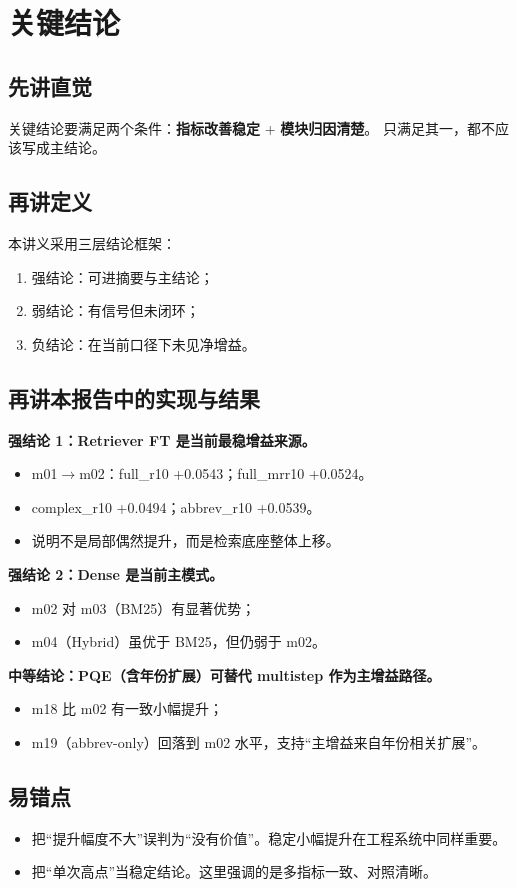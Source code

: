 \documentclass[UTF8,a4paper,12pt]{ctexart}
\begin{document}
\section{关键结论}
\subsection{先讲直觉}
关键结论要满足两个条件：\textbf{指标改善稳定} + \textbf{模块归因清楚}。
只满足其一，都不应该写成主结论。

\subsection{再讲定义}
本讲义采用三层结论框架：
\begin{enumerate}
  \item 强结论：可进摘要与主结论；
  \item 弱结论：有信号但未闭环；
  \item 负结论：在当前口径下未见净增益。
\end{enumerate}

\subsection{再讲本报告中的实现与结果}
\textbf{强结论 1：Retriever FT 是当前最稳增益来源。}
\begin{itemize}
  \item m01$\rightarrow$m02：full\_r10 +0.0543；full\_mrr10 +0.0524。
  \item complex\_r10 +0.0494；abbrev\_r10 +0.0539。
  \item 说明不是局部偶然提升，而是检索底座整体上移。
\end{itemize}

\textbf{强结论 2：Dense 是当前主模式。}
\begin{itemize}
  \item m02 对 m03（BM25）有显著优势；
  \item m04（Hybrid）虽优于 BM25，但仍弱于 m02。
\end{itemize}

\textbf{中等结论：PQE（含年份扩展）可替代 multistep 作为主增益路径。}
\begin{itemize}
  \item m18 比 m02 有一致小幅提升；
  \item m19（abbrev-only）回落到 m02 水平，支持“主增益来自年份相关扩展”。
\end{itemize}

\subsection{易错点}
\begin{itemize}
  \item 把“提升幅度不大”误判为“没有价值”。稳定小幅提升在工程系统中同样重要。
  \item 把“单次高点”当稳定结论。这里强调的是多指标一致、对照清晰。
\end{itemize}
\end{document}
